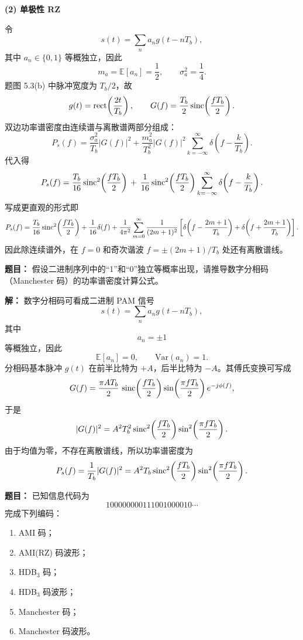 \textbf{(2) 单极性 RZ}\par
令
\[
s(t)=\sum_n a_n g(t-nT_b),
\]
其中 $a_n\in\{0,1\}$ 等概独立，因此
\[
m_a=\mathbb{E}[a_n]=\frac12,\qquad \sigma_a^2=\frac14.
\]
题图 5.3(b) 中脉冲宽度为 $T_b/2$，故
\[
g(t)=\operatorname{rect}\!\left(\frac{2t}{T_b}\right),
\qquad
G(f)=\frac{T_b}{2}\operatorname{sinc}\!\left(\frac{fT_b}{2}\right).
\]
双边功率谱密度由连续谱与离散谱两部分组成：
\[
P_s(f)=\frac{\sigma_a^2}{T_b}|G(f)|^2+\frac{m_a^2}{T_b^2}|G(f)|^2
\sum_{k=-\infty}^{\infty}\delta\!\left(f-\frac{k}{T_b}\right).
\]
代入得
\[
P_s(f)=\frac{T_b}{16}\operatorname{sinc}^2\!\left(\frac{fT_b}{2}\right)
\,+\,\frac{1}{16}\operatorname{sinc}^2\!\left(\frac{fT_b}{2}\right)
\sum_{k=-\infty}^{\infty}\delta\!\left(f-\frac{k}{T_b}\right).
\]
写成更直观的形式即
\[
P_s(f)=\frac{T_b}{16}\operatorname{sinc}^2\!\left(\frac{fT_b}{2}\right)
+\frac{1}{16}\delta(f)
+\frac{1}{4\pi^2}\sum_{m=0}^{\infty}\frac{1}{(2m+1)^2}
\left[
\delta\!\left(f-\frac{2m+1}{T_b}\right)
+\delta\!\left(f+\frac{2m+1}{T_b}\right)
\right].
\]
因此除连续谱外，在 $f=0$ 和奇次谐波 $f=\pm(2m+1)/T_b$ 处还有离散谱线。

\medskip
{}
\textbf{题目：}
假设二进制序列中的“1”和“0”独立等概率出现，请推导数字分相码（Manchester 码）的功率谱密度计算公式。

\par\textbf{解：}
数字分相码可看成二进制 PAM 信号
\[
s(t)=\sum_n a_n g(t-nT_b),
\]
其中
\[
a_n=\pm 1
\]
等概独立，因此
\[
\mathbb{E}[a_n]=0,\qquad \mathrm{Var}(a_n)=1.
\]
分相码基本脉冲 $g(t)$ 在前半比特为 $+A$，后半比特为 $-A$。其傅氏变换可写成
\[
G(f)=\frac{\pi A T_b}{2}\,\operatorname{sinc}\!\left(\frac{fT_b}{2}\right)\sin\!\left(\frac{\pi fT_b}{2}\right)e^{-j\phi(f)},
\]
于是
\[
|G(f)|^2=A^2T_b^2\operatorname{sinc}^2\!\left(\frac{fT_b}{2}\right)\sin^2\!\left(\frac{\pi fT_b}{2}\right).
\]
由于均值为零，不存在离散谱线，所以功率谱密度为
\[
P_s(f)=\frac{1}{T_b}|G(f)|^2
=A^2T_b\operatorname{sinc}^2\!\left(\frac{fT_b}{2}\right)\sin^2\!\left(\frac{\pi fT_b}{2}\right).
\]

\medskip
{}
\textbf{题目：}
已知信息代码为
\[
100000000111001000010\cdots
\]
完成下列编码：
\begin{enumerate}
\item AMI 码；
\item AMI(RZ) 码波形；
\item HDB$_3$ 码；
\item HDB$_3$ 码波形；
\item Manchester 码；
\item Manchester 码波形。
\end{enumerate}

